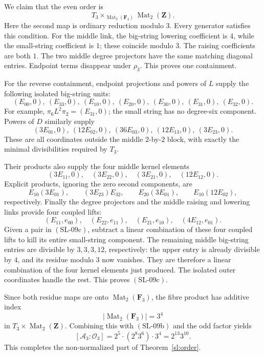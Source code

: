 We claim that the even order is
\[
T_3\times_{\operatorname{Mat}_2(\mathbf F_3)}
                 \operatorname{Mat}_2(\mathbf Z).
\tag{SL-09c}
\]
Here the second map is ordinary reduction modulo \(3\).
Every generator satisfies this condition.  For the middle
link, the big-string lowering coefficient is \(4\), while
the small-string coefficient is \(1\); these coincide
modulo \(3\).  The raising coefficients are both \(1\).
The two middle degree projectors have the same matching
diagonal entries.  Endpoint terms disappear under \(\rho_3\).
This proves one containment.

For the reverse containment, endpoint projections and powers
of \(L\) supply the following isolated big-string units:
\[
(E_{00},0),\ (E_{33},0),\
(E_{10},0),\ (E_{20},0),\ (E_{30},0),\
(E_{31},0),\ (E_{32},0).
\]
For example,
\(\pi_6L^2\pi_2=(E_{31},0)\); the small string has no
degree-six component.  Powers of \(D\) similarly supply
\[
(3E_{01},0),\ (12E_{02},0),\ (36E_{03},0),\
(12E_{13},0),\ (3E_{23},0).
\]
These are all coordinates outside the middle \(2\)-by-\(2\)
block, with exactly the minimal divisibilities required
by \(T_3\).

Their products also supply the four middle kernel elements
\[
(3E_{11},0),\quad(3E_{22},0),\quad
(3E_{21},0),\quad(12E_{12},0).
\]
Explicit products, ignoring the zero second components, are
\[
E_{10}(3E_{01}),\qquad
(3E_{23})E_{32},\qquad
E_{20}(3E_{01}),\qquad
E_{10}(12E_{02}),
\]
respectively.  Finally the degree projectors and the middle
raising and lowering links provide four coupled lifts:
\[
(E_{11},e_{00}),\quad (E_{22},e_{11}),\quad
(E_{21},e_{10}),\quad (4E_{12},e_{01}).
\]
Given a pair in \((\mathrm{SL\text{-}09c})\), subtract a
linear combination of these four coupled lifts to kill its
entire small-string component.  The remaining middle
big-string entries are divisible by \(3,3,3,12\), respectively:
the upper entry is already divisible by \(4\), and its
residue modulo \(3\) now vanishes.  They are therefore a
linear combination of the four kernel elements just produced.
The isolated outer coordinates handle the rest.  This proves
\((\mathrm{SL\text{-}09c})\).

Since both residue maps are onto
\(\operatorname{Mat}_2(\mathbf F_3)\), the fibre product has
additive index
\[
\left|\operatorname{Mat}_2(\mathbf F_3)\right|=3^4
\]
in \(T_3\times\operatorname{Mat}_2(\mathbf Z)\).
Combining this with \((\mathrm{SL\text{-}09b})\) and the
odd factor yields
\[
[\mathcal A_3:\mathcal O_3]
=2^5\cdot(2^8 3^6)\cdot3^4
=2^{13}3^{10}.
\]
This completes the non-normalized part of
Theorem~\ref{sl:order}.


